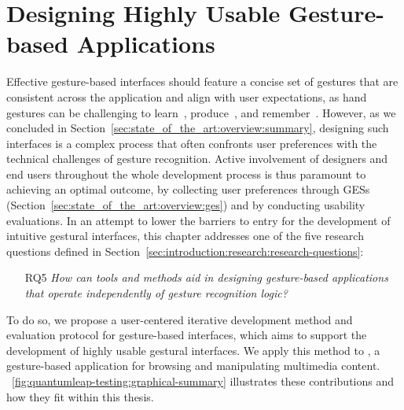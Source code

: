 \chapter{Designing Highly Usable Gesture-based Applications} \label{chap:lui}

Effective gesture-based interfaces should feature a concise set of gestures that are consistent across the application and align with user expectations, as hand gestures can be challenging to learn~\cite{Fruchard:2018}, produce~\cite{Vatavu:2013}, and remember~\cite{Nacenta:2013}. 
%
However, as we concluded in Section~\ref{sec:state_of_the_art:overview:summary}, designing such interfaces is a complex process that often confronts user preferences with the technical challenges of gesture recognition.
%
Active involvement of designers and end users throughout the whole development process is thus paramount to achieving an optimal outcome, \eg by collecting user preferences through GESs (Section~\ref{sec:state_of_the_art:overview:ges}) and by conducting usability evaluations.
%
In an attempt to lower the barriers to entry for the development of intuitive gestural interfaces, this chapter addresses one of the five research questions defined in Section~\ref{sec:introduction:research:research-questions}: 
\begin{itemize}
    \item [RQ5] \textit{How can tools and methods aid in designing gesture-based applications that operate independently of gesture recognition logic?}
\end{itemize}
To do so, we propose a user-centered iterative development method and evaluation protocol for gesture-based interfaces, which aims to support the development of highly usable gestural interfaces. We apply this method to \lui, a gesture-based application for browsing and manipulating multimedia content. 
%
\fig~\ref{fig:quantumleap-testing:graphical-summary} illustrates these contributions and how they fit within this thesis.


